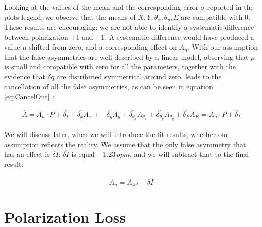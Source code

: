 Looking at the values of the mean and the corresponding error $\sigma$ reported in the plots legend, we observe that the means of $X,Y,\theta_{x},\theta_{y},E$ are compatible with $0$. These results are encouraging: we are not able to identify a systematic difference between polarization $+1$ and $-1$. A systematic difference would have produced a value $\mu$ shifted from zero, and a corresponding effect on $A_{n}$. 
With our assumption that the false asymmetries are well described by a linear model, observing that $\mu$ is small and compatible with zero for all the parameters, together with the evidence that $\delta q$ are distributed symmetrical around zero, leads to the cancellation of all the false asymmetries, as can be seen in equation \ref{eq:CancelOut} :

\begin{align} \label{eq:CancelOut}
\overline{A} = A_{n} \cdot P + \overline{\delta_{I}} + \overline{\delta_{x}}A_{x} + & \overline{\delta_{y}} A_{y} + \overline{\delta_{\theta_{x}}} A_{\theta_{x}} + \overline{\delta_{\theta_{y}}} A_{\theta_{y}} + \overline{\delta_{E}}A_{E} = A_{n} \cdot P + \overline{\delta_{I}}
\end{align}  

We will discuss later, when we will introduce the fit results, whether our assumption reflects the reality. We assume that the only false asymmetry that has an effect is $\delta I$: $\overline{\delta I}$ is equal $-1.23 \, ppm$, and we will subtract that to the final result:

\begin{align*}
A_{n} = \overline{A_{tot}} - \overline{\delta I}
\end{align*}

\newpage
\newpage
\section{Polarization Loss}

